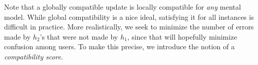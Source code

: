 \documentclass[letterpaper]{article} %
\newcommand{\bug}
    {\mbox{\rule{2mm}{2mm}}}
\newcommand{\Bug}[1]
    {\bug \footnote{BUG: {#1}}}
\newcommand{\ie}{\mbox{\it i.e.}}
\newcommand{\?}{\mbox{?}}
\newcommand{\hone}{\mbox{$h_1$}}
\newcommand{\htwo}{\mbox{$h_2$}}
\newcommand{\dtrainone}{\mbox{$D_1$}}
\begin{document}
Note that a globally compatible update is locally compatible for {\em any} mental model.  While global compatibility is a nice ideal, satisfying it for all instances is difficult in practice. More realistically, we seek to minimize the number of errors made by \htwo's that were not made by $\hone$, since that will hopefully minimize confusion among users. 
To make this precise, we introduce the notion of a {\em compatibility score}. 








\end{document}
